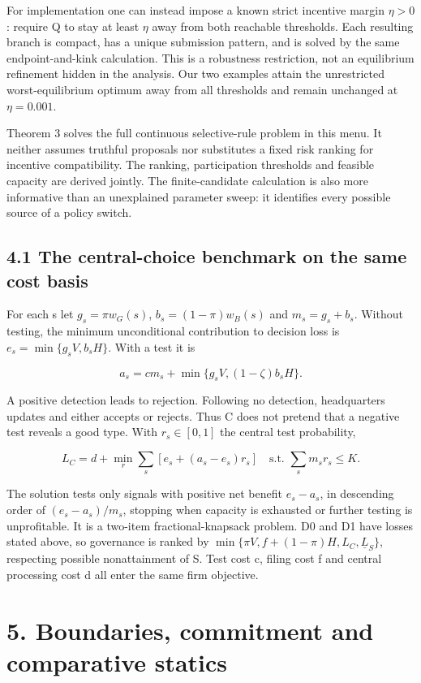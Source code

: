 \documentclass[
  11pt,
]{article}
\begin{document}
For implementation one can instead impose a known strict incentive
margin \(\eta>0\): require Q to stay at least \(\eta\) away from both
reachable thresholds. Each resulting branch is compact, has a unique
submission pattern, and is solved by the same endpoint-and-kink
calculation. This is a robustness restriction, not an equilibrium
refinement hidden in the analysis. Our two examples attain the
unrestricted worst-equilibrium optimum away from all thresholds and
remain unchanged at \(\eta=0.001\).

Theorem 3 solves the full continuous selective-rule problem in this
menu. It neither assumes truthful proposals nor substitutes a fixed risk
ranking for incentive compatibility. The ranking, participation
thresholds and feasible capacity are derived jointly. The
finite-candidate calculation is also more informative than an
unexplained parameter sweep: it identifies every possible source of a
policy switch.

\subsection{4.1 The central-choice benchmark on the same cost
basis}\label{the-central-choice-benchmark-on-the-same-cost-basis}

For each s let \(g_s=\pi w_G(s)\), \(b_s=(1-\pi)w_B(s)\) and
\(m_s=g_s+b_s\). Without testing, the minimum unconditional contribution
to decision loss is \(e_s=\min\{g_sV,b_sH\}\). With a test it is

\[a_s=cm_s+\min\{g_sV,(1-\zeta)b_sH\}.\]

A positive detection leads to rejection. Following no detection,
headquarters updates and either accepts or rejects. Thus C does not
pretend that a negative test reveals a good type. With \(r_s\in[0,1]\)
the central test probability,

\[L_C=d+\min_{r}\sum_s[e_s+(a_s-e_s)r_s]
\quad\text{s.t. }\sum_s m_sr_s\leq K. \tag{7}\]

The solution tests only signals with positive net benefit \(e_s-a_s\),
in descending order of \((e_s-a_s)/m_s\), stopping when capacity is
exhausted or further testing is unprofitable. It is a two-item
fractional-knapsack problem. D0 and D1 have losses stated above, so
governance is ranked by \(\min\{\pi V,f+(1-\pi)H,L_C,\underline L_S\}\),
respecting possible nonattainment of S. Test cost c, filing cost f and
central processing cost d all enter the same firm objective.

\section{5. Boundaries, commitment and comparative
statics}\label{boundaries-commitment-and-comparative-statics}
\end{document}
